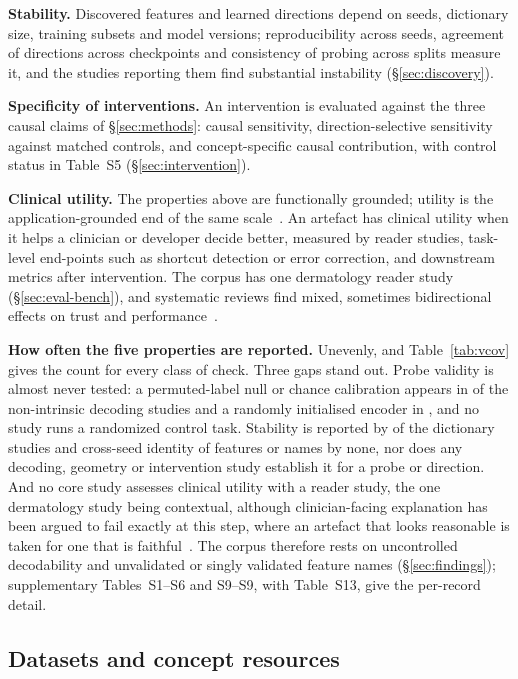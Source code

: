 \textbf{Stability.} Discovered features and learned directions depend on seeds, dictionary size,
training subsets and model versions; reproducibility across seeds, agreement of directions across
checkpoints and consistency of probing across splits measure it, and the studies reporting them find
substantial instability (\S\ref{sec:discovery}).

\textbf{Specificity of interventions.} An intervention is evaluated against the three causal claims
of \S\ref{sec:methods}: causal sensitivity, direction-selective sensitivity against matched controls,
and concept-specific causal contribution, with control status in Table~S5
(\S\ref{sec:intervention}).

\textbf{Clinical utility.} The properties above are functionally grounded; utility is the
application-grounded end of the same scale~\cite{doshivelez2017towards}. An artefact has clinical utility
when it helps a clinician or developer decide better, measured by reader studies, task-level end-points such as shortcut detection or error
correction, and downstream metrics after intervention. The corpus has one dermatology reader study
(\S\ref{sec:eval-bench}), and systematic reviews find mixed, sometimes bidirectional effects on trust and
performance~\cite{rosenbacke2024how}.

\textbf{How often the five properties are reported.} Unevenly, and Table~\ref{tab:vcov} gives the
count for every class of check. Three gaps stand out. Probe validity is almost never tested: a
permuted-label null or chance calibration appears in \Nprobectrl{} of the \Ndecni{} non-intrinsic decoding
studies and a randomly initialised encoder in \Nproberand{}, and no study runs a randomized control task.
Stability is reported by \Nsaestab{} of the \Nsae{} dictionary studies and cross-seed identity of features
or names by none, nor does any decoding, geometry or intervention study establish it for a probe or
direction. And no core study assesses clinical utility with a reader study, the one dermatology study
being contextual, although clinician-facing explanation has been argued to fail exactly at this step,
where an artefact that looks reasonable is taken for one that is faithful~\cite{ghassemi2021falsehope}.
The corpus therefore rests on uncontrolled decodability and unvalidated or singly validated feature names
(\S\ref{sec:findings}); supplementary Tables~S1--S6 and S9--S9, with Table~S13, give the per-record
detail.

\subsection{Datasets and concept resources}
\label{sec:eval-data}

